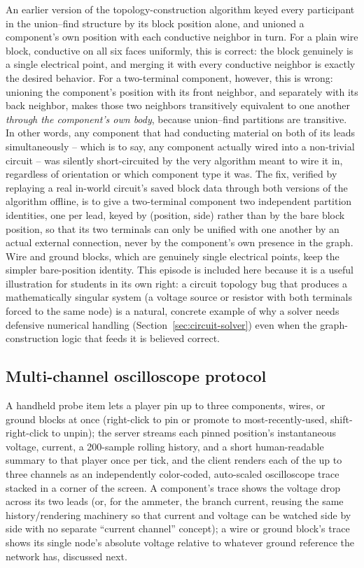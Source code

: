An earlier version of the topology-construction algorithm keyed every participant in the
union--find structure by its block position alone, and unioned a component's own position
with each conductive neighbor in turn. For a plain wire block, conductive on all six faces
uniformly, this is correct: the block genuinely is a single electrical point, and merging it
with every conductive neighbor is exactly the desired behavior. For a two-terminal
component, however, this is wrong: unioning the component's position with its front
neighbor, and separately with its back neighbor, makes those two neighbors transitively
equivalent to one another \emph{through the component's own body}, because union--find
partitions are transitive. In other words, any component that had conducting material on
both of its leads simultaneously -- which is to say, any component actually wired into a
non-trivial circuit -- was silently short-circuited by the very algorithm meant to wire it
in, regardless of orientation or which component type it was. The fix, verified by
replaying a real in-world circuit's saved block data through both versions of the
algorithm offline, is to give a two-terminal component two independent partition
identities, one per lead, keyed by (position, side) rather than by the bare block position,
so that its two terminals can only be unified with one another by an actual external
connection, never by the component's own presence in the graph. Wire and ground blocks,
which are genuinely single electrical points, keep the simpler bare-position identity. This
episode is included here because it is a useful illustration for students in its own right:
a circuit topology bug that produces a mathematically singular system (a voltage source or
resistor with both terminals forced to the same node) is a natural, concrete example of why
a solver needs defensive numerical handling (Section~\ref{sec:circuit-solver}) even when the
graph-construction logic that feeds it is believed correct.

\subsection{Multi-channel oscilloscope protocol}

A handheld probe item lets a player pin up to three components, wires, or ground blocks at
once (right-click to pin or promote to most-recently-used, shift-right-click to unpin); the
server streams each pinned position's instantaneous voltage, current, a 200-sample rolling
history, and a short human-readable summary to that player once per tick, and the client
renders each of the up to three channels as an independently color-coded, auto-scaled
oscilloscope trace stacked in a corner of the screen. A component's trace shows the voltage
drop across its two leads (or, for the ammeter, the branch current, reusing the same
history/rendering machinery so that current and voltage can be watched side by side with no
separate ``current channel'' concept); a wire or ground block's trace shows its single
node's absolute voltage relative to whatever ground reference the network has, discussed
next.
